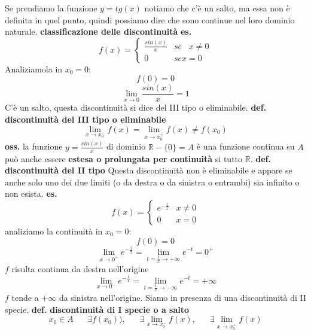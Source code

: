 Se prendiamo la funzione $y=tg(x)$ notiamo che c'è un salto, ma essa non è definita in quel punto, quindi possiamo dire che sono continue nel loro dominio naturale.
\newline
\newline
\newline
\textbf{classificazione delle discontinuità}
\textbf{es.} 
\[
    f(x) =
    \begin{cases}
        \frac{sin(x)}{x} & se \;\;\; x \neq 0 \\
        0 & se x = 0
    \end{cases}
\]
Analiziamola in $x_0 = 0$:
\[
    f(0) = 0 
\]
\[
    \lim_{x\rightarrow 0} \frac{sin(x)}{x} = 1
\]
C'è un salto, questa discontinuità si dice del III tipo o eliminabile.
\newline
\newline
\textbf{def.} \textbf{discontinuità del III tipo o eliminabile}
\[
    \lim_{x\rightarrow x_0^{-}} f(x) = \lim_{x\rightarrow x_0^{+}} f(x) \neq f(x_0) 
\]
\textbf{oss.} la funzione $y = \frac{sin(x)}{x}$ di dominio $\mathbb{R} - \{0\} = A$ è una funzione continua su $A$ può anche essere \textbf{estesa o prolungata per continuità} si tutto $\mathbb{R}$.
\newline
\newline
\textbf{def.} \textbf{discontinuità del II tipo}
Questa discontinuità non è eliminabile e appare se anche solo uno dei due limiti (o da destra o da sinistra o entrambi) sia infinito o non esista.
\newline
\textbf{es.} 
\[
    f(x) = \begin{cases}
        e^{-\frac{1}{x}} & x \neq 0 \\
        0 & x = 0
    \end{cases}
\]
analiziamo la continuità in $x_0 = 0$:
\[
    f(0) = 0
\]
\[
    \lim_{x\rightarrow 0^+} e^{-\frac{1}{x}} = \lim_{t=\frac{1}{x}\rightarrow + \infty} e^{-t} = 0^{+}
\]
$f$ risulta continua da destra nell'origine
\[
    \lim_{x\rightarrow 0^-} e^{-\frac{1}{x}} =\lim_{t=\frac{1}{x}\rightarrow -\infty} e^{-t} = + \infty
\]
$f$ tende a $+ \infty$ da sinistra nell'origine.
\newline
Siamo in presenza di una discontinuità di II specie.
\newline
\newline
\textbf{def.} \textbf{discontinuità di I specie o a salto}
\[
    x_0 \in A \;\;\;\;\;\; \exists f(x_0)), \;\;\;\;\;\; \exists \lim_{x\rightarrow x_0^-} f(x), \;\;\;\;\;\; \exists \lim_{x\rightarrow x_0^+} f(x)
\]
